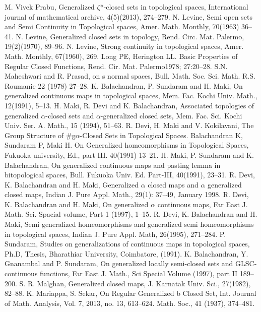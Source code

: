 \begin{thebibliography}{99}
 M. Vivek Prabu, Generalized $\zeta$*-closed sets in topological spaces, International journal of mathematical archive, 4(5)(2013), 274--279.
 N. Levine, Semi open sets and Semi Continuity in Topological spaces, Amer. Math. Monthly, 70(1963) 36--41.
 N. Levine, Generalized closed sets in topology, Rend. Circ. Mat. Palermo,  19(2)(1970), 89--96.
 N. Levine, Strong continuity in topological spaces, Amer. Math. Monthly, 67(1960), 269.
 Long PE, Herington LL. Basic Properties of Regular Closed Functions, Rend. Cir. Mat. Palermo1978; 27:20--28. 
 S.N. Maheshwari and R. Prasad, on s normal spaces, Bull. Math. Soc. Sci. Math. R.S. Roumanie 22 (1978) 27--28.
 K. Balachandran, P. Sundaram and H. Maki, On generalized continuous maps in topological spaces, Mem. Fac. Kochi Univ. Math., 12(1991), 5--13. 
 H. Maki, R. Devi and K. Balachandran, Associated topologies of generalized $\alpha$-closed sets and $\alpha$-generalized closed sets, Mem. Fac. Sci. Kochi Univ. Ser. A. Math., 15 (1994), 51--63.
 R. Devi, H. Maki and V. Kokilavani, The Group Structure of \#g$\alpha$-Closed Sets in Topological Spaces.
 Balachandran K, Sundaram P, Maki H. On Generalized homeomorphisms in Topological Spaces, Fukuoka university, Ed., part III. 40(1991) 13--21.
 H. Maki, P. Sundaram and K. Balachandran, On generalized continuous maps and pasting lemma in bitopological spaces, Bull. Fukuoka Univ. Ed. Part-III, 40(1991), 23--31.
 R. Devi, K. Balachandran and H. Maki, Generalized $\alpha$ closed maps and $\alpha$ generalized closed maps, Indian J. Pure Appl. Math., 29(1): 37--49, January 1998.
 R. Devi, K. Balachandran and H. Maki, On generalized $\alpha$ continuous maps, Far East J. Math. Sci. Spacial volume, Part 1 (1997), 1--15.
 R. Devi, K. Balachandran and H. Maki, Semi generalized homeomorphisms and generalized semi homeomorphisms in topological spaces, Indian J. Pure Appl. Math, 26(1995), 271--284.
 P. Sundaram, Studies on generalizations of continuous maps in topological spaces, Ph.D, Thesis, Bharathiar University, Coimbatore, (1991).
 K. Balachandran, Y. Gnanambal and P. Sundaram, On generalized locally semi-closed sets and GLSC-continuous functions, Far East J. Math., Sci Special Volume (1997), part II 189--200.
 S. R. Malghan, Generalized closed maps, J. Karnatak Univ. Sci., 27(1982), 82--88.
 K. Mariappa, S. Sekar, On Regular Generalized b Closed Set, Int. Journal of Math. Analysis, 	Vol. 7, 2013, no. 13, 613--624. Math. Soc., 41 (1937), 374--481.

\end{thebibliography}
